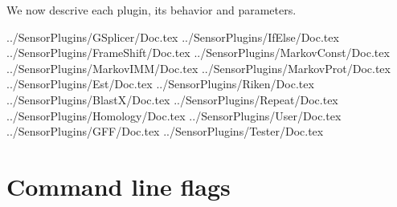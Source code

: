 \documentclass[a4paper,titlepage]{report}
\begin{document}
We now descrive each plugin, its behavior and parameters.










 {../SensorPlugins/GSplicer/Doc.tex}
 {../SensorPlugins/IfElse/Doc.tex}
 {../SensorPlugins/FrameShift/Doc.tex}
 {../SensorPlugins/MarkovConst/Doc.tex}
 {../SensorPlugins/MarkovIMM/Doc.tex}
 {../SensorPlugins/MarkovProt/Doc.tex}
 {../SensorPlugins/Est/Doc.tex}
 {../SensorPlugins/Riken/Doc.tex}
 {../SensorPlugins/BlastX/Doc.tex}
 {../SensorPlugins/Repeat/Doc.tex}
 {../SensorPlugins/Homology/Doc.tex}
 {../SensorPlugins/User/Doc.tex}
 {../SensorPlugins/GFF/Doc.tex}
 {../SensorPlugins/Tester/Doc.tex}

\section{Command line flags}
 
\end{document}
